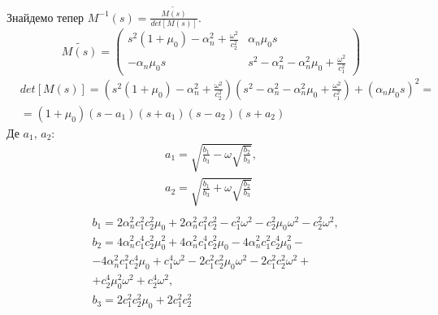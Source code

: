 Знайдемо тепер $M^{-1}(s) = \frac{\widetilde{M(s)}}{det[M(s)]}$.
\begin{equation}
    \widetilde{M(s)} = \begin{pmatrix}
        s^2 (1 + \mu_0) -\alpha_n^2 + \frac{\omega^2}{c_2^2} & \alpha_n \mu_0 s \\
        -\alpha_n \mu_0 s & s^2 - \alpha_n^2 - \alpha_n^2\mu_0 + \frac{\omega^2}{c_1^2}
     \end{pmatrix}
\end{equation}
\begin{align}
    &det[M(s)] = (s^2 (1 + \mu_0) -\alpha_n^2 + \frac{\omega^2}{c_2^2})(s^2 - \alpha_n^2 - \alpha_n^2\mu_0 + \frac{\omega^2}{c_1^2}) + (\alpha_n \mu_0 s)^2 = \nonumber \\
    &=(1+\mu_0)(s - a_1)(s + a_1)(s - a_2)(s + a_2)
\end{align}
Де $a_1$, $a_2$:
\begin{align*}
    a_1 = \sqrt{\frac{b_1}{b_3} - \omega \sqrt{\frac{b_2}{b_3}}}, \\
    a_2 = \sqrt{\frac{b_1}{b_3} + \omega \sqrt{\frac{b_2}{b_3}}} \\
\end{align*}
\begin{align*}
    &b_1 = 2 \alpha_n^2 c_1^2 c_2^2 \mu_0 + 2 \alpha_n^2 c_1^2 c_2^2 - c_1^2 \omega^2 - c_2^2 \mu_0 \omega^2 - c_2^2 \omega^2, \\
    &b_2 = 4\alpha_n^2 c_1^4 c_2^2 \mu_0^2 + 4 \alpha_n^2 c_1^4 c_2^2 \mu_0 - 4 \alpha_n^2 c_1^2 c_2^4 \mu_0^2  - \\
    &- 4 \alpha_n^2 c_1^2 c_2^4 \mu_0 + c_1^4 \omega^2 - 2 c_1^2 c_2^2 \mu_0 \omega^2 - 2 c_1^2 c_2^2 \omega^2 + \\ 
    &+ c_2^4 \mu_0^2 \omega^2 + c_2^4 \omega^2, \\
    &b_3 = 2 c_1^2 c_2^2 \mu_0 + 2 c_1^2 c_2^2
\end{align*}

